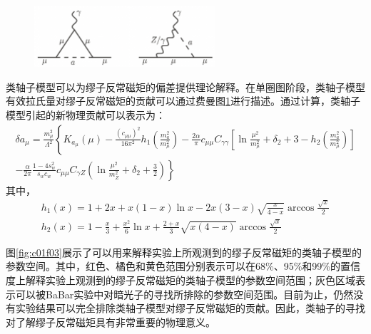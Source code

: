 \begin{figure}[!htbp]
    \centering
    \includegraphics[width=0.60\textwidth]{figures/chapter01/ALP_g_2.jpg}
    \label{fig:c01f02}
\end{figure}

类轴子模型可以为缪子反常磁矩的偏差提供理论解释。在单圈图阶段，类轴子模型有效拉氏量对缪子反常磁矩的贡献可以通过费曼图\ref{fig:c01f02}进行描述。通过计算，类轴子模型引起的新物理贡献可以表示为：
\begin{equation}\label{eq:1-16}
    \begin{array}{c}
    \delta a_{\mu}=\frac{m_{\mu}^{2}}{\Lambda^{2}}\left\{K_{a_{\mu}}(\mu)-\frac{\left(c_{\mu \mu}\right)^{2}}{16 \pi^{2}} h_{1}\left(\frac{m_{a}^{2}}{m_{\mu}^{2}}\right)-\frac{2 \alpha}{\pi} c_{\mu \mu} C_{\gamma \gamma}\left[\ln \frac{\mu^{2}}{m_{\mu}^{2}}+\delta_{2}+3-h_{2}\left(\frac{m_{a}^{2}}{m_{\mu}^{2}}\right)\right]\right. \\
    \left.-\frac{\alpha}{2 \pi} \frac{1-4 s_{w}^{2}}{s_{w} c_{w}} c_{\mu \mu} C_{\gamma Z}\left(\ln \frac{\mu^{2}}{m_{Z}^{2}}+\delta_{2}+\frac{3}{2}\right)\right\} 
    \end{array}
\end{equation}
其中，
\begin{equation}\label{eq:1-17}
    \begin{array}{l}
    h_{1}(x)=1+2 x+x(1-x) \ln x-2 x(3-x) \sqrt{\frac{x}{4-x}} \arccos \frac{\sqrt{x}}{2} \\
    h_{2}(x)=1-\frac{x}{3}+\frac{x^{2}}{6} \ln x+\frac{2+x}{3} \sqrt{x(4-x)} \arccos \frac{\sqrt{x}}{2}
    \end{array}
\end{equation}

图\ref{fig:c01f03}展示了可以用来解释实验上所观测到的缪子反常磁矩的类轴子模型的参数空间。其中，红色、橘色和黄色范围分别表示可以在68\%、95\%和99\%的置信度上解释实验上观测到的缪子反常磁矩的类轴子模型的参数空间范围；灰色区域表示可以被BaBar实验中对暗光子的寻找所排除的参数空间范围。目前为止，仍然没有实验结果可以完全排除类轴子模型对缪子反常磁矩的贡献。因此，类轴子的寻找对了解缪子反常磁矩具有非常重要的物理意义。

